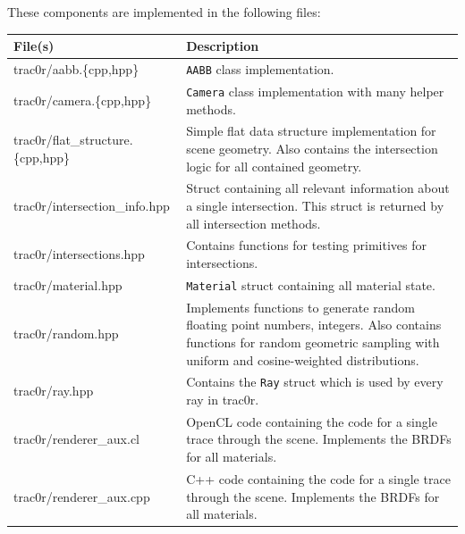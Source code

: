 \documentclass[
  twoside,
  11pt, a4paper,
  footinclude=true,
  headinclude=true,
  cleardoublepage=empty
]{scrreprt}
\begin{document}
\begin{minipage}{\textwidth}
    These components are implemented in the following files:

    \begin{table}[H]
        \centering
        \begin{tabularx}{\textwidth}{l | X}
            File(s)                    & Description \\ \hline
            trac0r/aabb.\{cpp,hpp\}      & \texttt{AABB} class implementation. \\
            trac0r/camera.\{cpp,hpp\}    & \texttt{Camera} class implementation with many helper methods. \\
            trac0r/flat\_structure.\{cpp,hpp\}  & Simple flat data structure implementation for scene geometry.
                                         Also contains the intersection logic for all contained
                                         geometry.\\
            trac0r/intersection\_info.hpp & Struct containing all relevant information about a single
                                         intersection. This struct is returned by all intersection
                                         methods. \\
            trac0r/intersections.hpp   & Contains functions for testing primitives for intersections. \\
            trac0r/material.hpp        & \texttt{Material} struct containing all material state. \\
            trac0r/random.hpp          & Implements functions to generate random floating point
                                         numbers, integers. Also contains functions for random
                                         geometric sampling with uniform and cosine-weighted
                                         distributions. \\
            trac0r/ray.hpp             & Contains the \texttt{Ray} struct which is used by every ray in
                                         trac0r.\\
            trac0r/renderer\_aux.cl    & OpenCL code containing the code for a single trace through the
                                         scene. Implements the BRDFs for all materials. \\
            trac0r/renderer\_aux.cpp   & C++ code containing the code for a single trace through the
                                         scene. Implements the BRDFs for all materials. \\

\end{tabularx}
\end{table}
\end{minipage}
\end{document}
